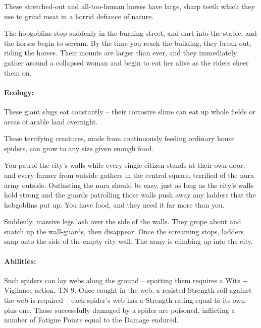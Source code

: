 \begin{multicols}{2}
These stretched-out and all-too-human horses have large, sharp teeth which they use to grind meat in a horrid defiance of nature.

\begin{boxtext}

	The hobgoblins stop suddenly in the burning street, and dart into the stable, and the horses begin to scream.
	By the time you reach the building, they break out, riding the horses.
	Their mounts are larger than ever, and they immediately gather around a collapsed woman and begin to eat her alive as the riders cheer them on.

\end{boxtext}

\label{nura_slug}

\paragraph{Ecology:} These giant slugs eat constantly -- their corrosive slime can eat up whole fields or areas of arable land overnight.


\label{nura_spider}

These terrifying creatures, made from continuously feeding ordinary house spiders, can grow to any size given enough food.

\begin{boxtext}

	You patrol the city's walls while every single citizen stands at their own door, and every farmer from outside gathers in the central square, terrified of the nura army outside.
	Outlasting the nura should be easy, just as long as the city's walls hold strong and the guards patrolling those walls push away any ladders that the hobgoblins put up.
	You have food, and they need it far more than you.

	Suddenly, massive legs lash over the side of the walls.
	They grope about and snatch up the wall-guards, then disappear.
	Once the screaming stops, ladders snap onto the side of the empty city wall.
	The army is climbing up into the city.

\end{boxtext}

\nuraspider

\paragraph{Abilities:} Such spiders can lay webs along the ground -- spotting them requires a Wits + Vigilance action, TN 9.
Once caught in the web, a resisted Strength roll against the web is required -- each spider's web has a Strength rating equal to its own plus one.
Those successfully damaged by a spider are poisoned, inflicting a number of Fatigue Points equal to the Damage endured.


\end{multicols}
